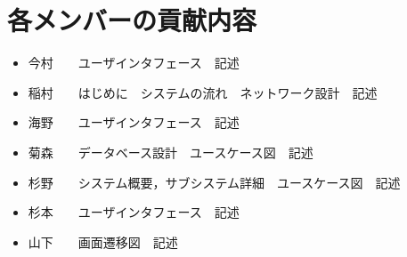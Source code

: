 \section{各メンバーの貢献内容}\label{sec:huroku}
\begin{itemize}
\item 今村　　ユーザインタフェース　記述
\item 稲村　　はじめに　システムの流れ　ネットワーク設計　記述
\item 海野　　ユーザインタフェース　記述
\item 菊森　　データベース設計　ユースケース図　記述
\item 杉野　　システム概要，サブシステム詳細　ユースケース図　記述
\item 杉本　　ユーザインタフェース　記述
\item 山下　　画面遷移図　記述
\end{itemize}